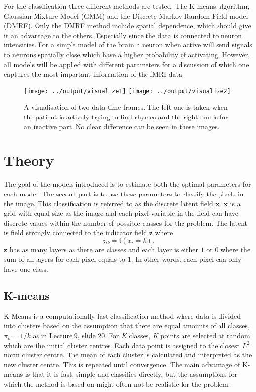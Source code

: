 \documentclass[a4paper,english]{article}
\begin{document}
For the classification three different methods are tested.
The K-means algorithm, Gaussian Mixture Model (GMM) and the Discrete Markov Random Field model (DMRF).
Only the DMRF method include spatial dependence, which should give it an advantage to the others.
Especially since the data is connected to neuron intensities.
For a simple model of the brain a neuron when active will send signals to neurons spatially close which have a higher probability of activating.
However, all models will be applied with different parameters for a discussion of which one captures the most important information of the fMRI data.

\begin{figure}[H]
  \centering
  \texttt{[image: ../output/visualize1]}
  \texttt{[image: ../output/visualize2]}
  \caption{A visualisation of two data time frames. The left one is taken when the patient is actively trying to find rhymes and the right one is for an inactive part. No clear difference can be seen in these images.}
  \label{fig:intro:vis}
\end{figure}

\section{Theory}
The goal of the models introduced is to estimate both the optimal parameters for each model.
The second part is to use these parameters to classify the pixels in the image.
This classification is referred to as the discrete latent field $\boldsymbol{x}$.
$\boldsymbol{x}$ is a grid with equal size as the image and each pixel variable in the field can have discrete values within the number of possible classes for the problem.
The latent is field strongly connected to the indicator field $\boldsymbol{z}$ where
\begin{equation}
  z_{ik} = \mathds{I}(x_i = k).
\end{equation}
$\boldsymbol{z}$ has as many layers as there are classes and each layer is either $1$ or $0$ where the sum of all layers for each pixel equals to $1$.
In other words, each pixel can only have one class.

\subsection{K-means}

K-Means is a computationally fast classification method where data is divided into clusters based on the assumption that there are equal amounts of all classes, $\pi_k = 1 / k$ as in Lecture 9, slide 20\cite{L09}. For \textit{K} classes, \textit{K} points are selected at random which are the initial cluster centres. Each data point is assigned to the closest $L^2$ norm cluster centre. The mean of each cluster is calculated and interpreted as the new cluster centre. This is repeated until convergence. The main advantage of K-means is that it is fast, simple and classifies directly, but the assumptions for which the method is based on might often not be realistic for the problem.
\end{document}

